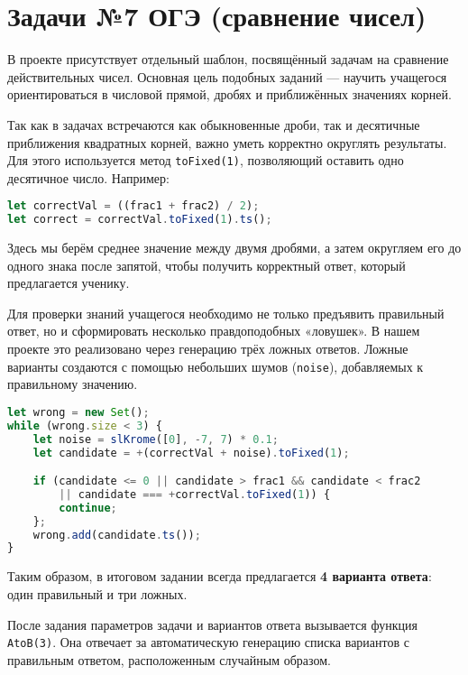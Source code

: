\section{Задачи №7 ОГЭ (сравнение чисел)}
В проекте присутствует отдельный шаблон, посвящённый задачам на сравнение действительных чисел. 
Основная цель подобных заданий --- научить учащегося ориентироваться в числовой прямой, дробях и приближённых значениях корней.  

Так как в задачах встречаются как обыкновенные дроби, так и десятичные приближения квадратных корней, 
важно уметь корректно округлять результаты. Для этого используется метод \verb|toFixed(1)|, позволяющий оставить одно десятичное число. Например:

\begin{lstlisting}[language=JavaScript]
let correctVal = ((frac1 + frac2) / 2);
let correct = correctVal.toFixed(1).ts();
\end{lstlisting}
Здесь мы берём среднее значение между двумя дробями, а затем округляем его до одного знака после запятой, 
чтобы получить корректный ответ, который предлагается ученику.  
 

Для проверки знаний учащегося необходимо не только предъявить правильный ответ, 
но и сформировать несколько правдоподобных «ловушек». 
В нашем проекте это реализовано через генерацию трёх ложных ответов. 
Ложные варианты создаются с помощью небольших шумов (\verb|noise|), добавляемых к правильному значению.  

\begin{lstlisting}[language=JavaScript]
let wrong = new Set();
while (wrong.size < 3) {
    let noise = slKrome([0], -7, 7) * 0.1;
    let candidate = +(correctVal + noise).toFixed(1);

    if (candidate <= 0 || candidate > frac1 && candidate < frac2 
        || candidate === +correctVal.toFixed(1)) {
        continue;
    };
    wrong.add(candidate.ts());
}
\end{lstlisting}

Таким образом, в итоговом задании всегда предлагается \textbf{4 варианта ответа}: один правильный и три ложных.  

После задания параметров задачи и вариантов ответа вызывается функция \verb|AtoB(3)|. 
Она отвечает за автоматическую генерацию списка вариантов с правильным ответом, расположенным случайным образом.  

